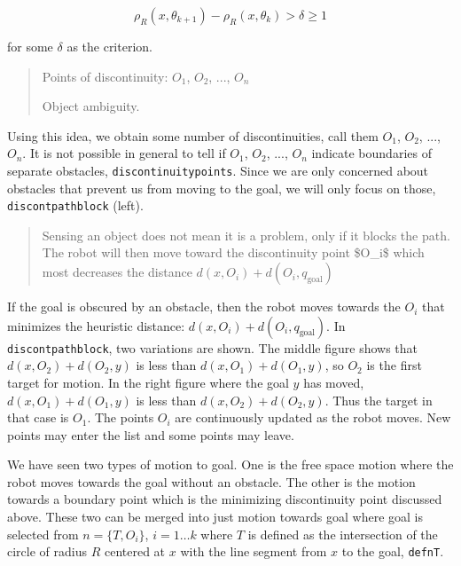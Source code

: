 \[\rho_R(x,\theta_{k+1}) - \rho_R(x,\theta_k) > \delta \geq 1\]

for some \(\delta\) as the criterion.

\begin{quote}
Points of discontinuity: \(O_1\), \(O_2\), ..., \(O_n\)

Object ambiguity.
\end{quote}

Using this idea, we obtain some number of discontinuities, call them
\(O_1\), \(O_2\), ..., \(O_n\). It is not possible in general to tell if
\(O_1\), \(O_2\), ..., \(O_n\) indicate boundaries of separate
obstacles, \texttt{discontinuitypoints}. Since we are only concerned
about obstacles that prevent us from moving to the goal, we will only
focus on those, \texttt{discontpathblock} (left).

\begin{quote}
Sensing an object does not mean it is a problem, only if it blocks the
path. The robot will then move toward the discontinuity point \$O\_i\$
which most decreases the distance \(d(x, O_i) + d(O_i,q_{\text{goal}})\)
\end{quote}

If the goal is obscured by an obstacle, then the robot moves towards the
\(O_i\) that minimizes the heuristic distance:
\(d(x, O_i) + d(O_i,q_{\text{goal}})\). In \texttt{discontpathblock},
two variations are shown. The middle figure shows that
\(d(x,O_2) + d(O_2,y)\) is less than \(d(x,O_1) + d(O_1,y)\), so \(O_2\)
is the first target for motion. In the right figure where the goal \(y\)
has moved, \(d(x,O_1) + d(O_1,y)\) is less than \(d(x,O_2) + d(O_2,y)\).
Thus the target in that case is \(O_1\). The points \(O_i\) are
continuously updated as the robot moves. New points may enter the list
and some points may leave.

We have seen two types of motion to goal. One is the free space motion
where the robot moves towards the goal without an obstacle. The other is
the motion towards a boundary point which is the minimizing
discontinuity point discussed above. These two can be merged into just
motion towards goal where goal is selected from \(n = \{ T, O_i\}\),
\(i=1 \dots k\) where \(T\) is defined as the intersection of the circle
of radius \(R\) centered at \(x\) with the line segment from \(x\) to
the goal, \texttt{defnT}.

